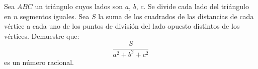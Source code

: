 Sea $ABC$ un triángulo cuyos lados son $a$, $b$, $c$. Se divide cada lado del triángulo en $n$ segmentos iguales. Sea $S$ la suma de los cuadrados de las distancias de cada vértice a cada uno de los puntos de división del lado opuesto distintos de los vértices.
Demuestre que: 
\[\frac{S}{a^2+b^2+c^2}\]
es un número racional.